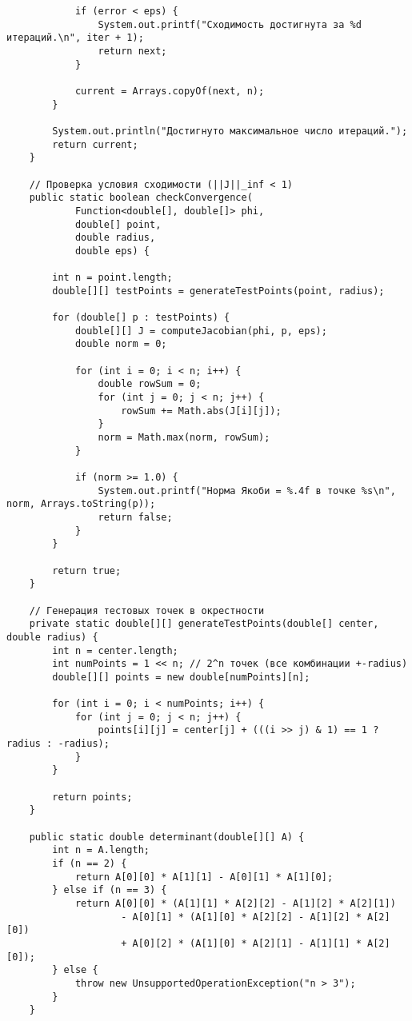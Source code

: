 \begin{verbatim}
            if (error < eps) {
                System.out.printf("Сходимость достигнута за %d итераций.\n", iter + 1);
                return next;
            }

            current = Arrays.copyOf(next, n);
        }

        System.out.println("Достигнуто максимальное число итераций.");
        return current;
    }

    // Проверка условия сходимости (||J||_inf < 1)
    public static boolean checkConvergence(
            Function<double[], double[]> phi,
            double[] point,
            double radius,
            double eps) {

        int n = point.length;
        double[][] testPoints = generateTestPoints(point, radius);

        for (double[] p : testPoints) {
            double[][] J = computeJacobian(phi, p, eps);
            double norm = 0;

            for (int i = 0; i < n; i++) {
                double rowSum = 0;
                for (int j = 0; j < n; j++) {
                    rowSum += Math.abs(J[i][j]);
                }
                norm = Math.max(norm, rowSum);
            }

            if (norm >= 1.0) {
                System.out.printf("Норма Якоби = %.4f в точке %s\n", norm, Arrays.toString(p));
                return false;
            }
        }

        return true;
    }

    // Генерация тестовых точек в окрестности
    private static double[][] generateTestPoints(double[] center, double radius) {
        int n = center.length;
        int numPoints = 1 << n; // 2^n точек (все комбинации +-radius)
        double[][] points = new double[numPoints][n];

        for (int i = 0; i < numPoints; i++) {
            for (int j = 0; j < n; j++) {
                points[i][j] = center[j] + (((i >> j) & 1) == 1 ? radius : -radius);
            }
        }

        return points;
    }

    public static double determinant(double[][] A) {
        int n = A.length;
        if (n == 2) {
            return A[0][0] * A[1][1] - A[0][1] * A[1][0];
        } else if (n == 3) {
            return A[0][0] * (A[1][1] * A[2][2] - A[1][2] * A[2][1])
                    - A[0][1] * (A[1][0] * A[2][2] - A[1][2] * A[2][0])
                    + A[0][2] * (A[1][0] * A[2][1] - A[1][1] * A[2][0]);
        } else {
            throw new UnsupportedOperationException("n > 3");
        }
    }


\end{verbatim}

